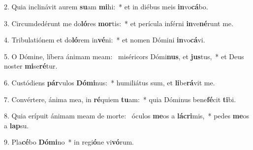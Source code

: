 2. Quia inclinávit aurem \textbf{su}am \textbf{mi}hi:~*  et in diébus meis \textbf{in}vo\textbf{cá}bo.\

3. Circumdedérunt me do\textbf{ló}res \textbf{mor}tis:~*  et perícula inférni \textbf{in}ve\textbf{né}runt me.\

4. Tribulatiónem et do\textbf{ló}rem in\textbf{vé}ni:~*  et nomen Dómini \textbf{in}vo\textbf{cá}vi.\

5. O Dómine, líbera ánimam meam: \dag\  miséricors Dómi\textbf{nus}, et \textbf{jus}tus,~*  et Deus noster \textbf{mi}se\textbf{ré}tur.\

6. Custódiens \textbf{pár}vulos \textbf{Dó}\textbf{mi}nus:~*  humiliátus sum, et \textbf{li}be\textbf{rá}vit me.\

7. Convértere, ánima mea, in \textbf{ré}quiem \textbf{tu}am:~*  quia Dóminus bene\textbf{fé}cit \textbf{ti}bi.\

8. Quia erípuit ánimam meam de morte: \dag\  óculos \textbf{me}os a \textbf{lá}\textbf{cri}mis,~*  pedes \textbf{me}os a \textbf{lap}su.\

9. Pla\textbf{cé}bo \textbf{Dó}\textbf{mi}no~*  in regi\textbf{ó}ne vi\textbf{vó}rum.\

